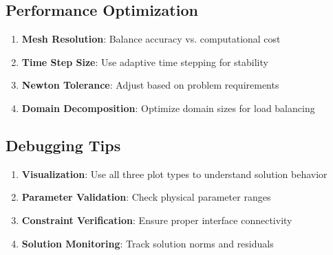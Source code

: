 \subsection{Performance Optimization}

\begin{enumerate}
    \item \textbf{Mesh Resolution}: Balance accuracy vs. computational cost
    \item \textbf{Time Step Size}: Use adaptive time stepping for stability
    \item \textbf{Newton Tolerance}: Adjust based on problem requirements
    \item \textbf{Domain Decomposition}: Optimize domain sizes for load balancing
\end{enumerate}

\subsection{Debugging Tips}

\begin{enumerate}
    \item \textbf{Visualization}: Use all three plot types to understand solution behavior
    \item \textbf{Parameter Validation}: Check physical parameter ranges
    \item \textbf{Constraint Verification}: Ensure proper interface connectivity
    \item \textbf{Solution Monitoring}: Track solution norms and residuals
\end{enumerate}
